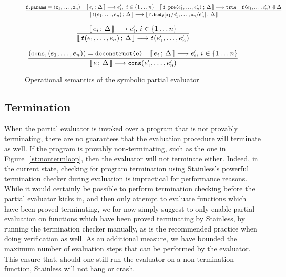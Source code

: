 \documentclass[a4paper,twoside]{article}
\newcommand{\lb}[2]{\llbracket\, #1\,;\, #2\, \rrbracket}
\newcommand{\RefFig}[1]{Figure~\ref{#1}}
\newcommand{\stt}[1]{\texttt{\small{#1}}}
\begin{document}
\begin{landscape}
\begin{figure}[htb]
\begin{framed}
\begin{equation}
\dfrac{
 \stt{f.params} = \langle \stt{x}_1, \ldots, \stt{x}_n \rangle
 \quad
 \lb{e_i}{\Delta} \longrightarrow e_i',\  i \in \{1 \ldots n\}
 \quad
 \lb{\stt{f.pre($e_1',\ldots,e_n'$)}}{\Delta} \longrightarrow \stt{true}
 \quad  \stt{f($e_1',\ldots,e_n'$)} \Downarrow \Delta
}{
  \lb{\stt{f}(e_1,\ldots,e_n)}{\Delta} \longrightarrow
  \lb{\stt{f.body}[\stt{x}_1/e_1',\ldots,\stt{x}_n/e_n']}{\Delta}
}
\label{fig:symbolicsem:fi2}
\end{equation}

\begin{equation}
\dfrac{
 \lb{e_i}{\Delta} \longrightarrow e_i',\, i \in \{1 \ldots n\}
}{
  \lb{\stt{f}(e_1,\ldots,e_n)}{\Delta} \longrightarrow
  \stt{f}(e_1',\ldots,e_n')
}
\label{fig:symbolicsem:fi3}
\end{equation}

\begin{equation}
\dfrac{
  (\stt{cons}, (e_1, \ldots, e_n)) = \stt{deconstruct(e)} \quad
  \lb{e_i}{\Delta} \longrightarrow e_i',\, i \in \{1 \ldots n\}
}{
  \lb{e}{\Delta} \longrightarrow \stt{cons}(e_1', \ldots, e_n')
}
\end{equation}

\end{framed}
\vspace{-10pt}
\caption{Operational semantics of the symbolic partial evaluator \label{fig:symbolicsem}}
\end{figure}
\end{landscape}

\subsection{Termination}
\label{term}

When the partial evaluator is invoked over a program that is not provably terminating, there are no guarantees that the evaluation procedure will terminate as well. If the program is provably non-terminating, such as the one in \RefFig{lst:nontermloop}, then the evaluator will not terminate either. Indeed, in the current state, checking for program termination using Stainless's powerful termination checker during evaluation is impractical for performance reasons. While it would certainly be possible to perform termination checking before the partial evaluator kicks in, and then only attempt to evaluate functions which have been proved terminating, we for now simply suggest to only enable partial evaluation on functions which have been proved terminating by Stainless, by running the termination checker manually, as is the recommended practice when doing verification as well. As an additional measure, we have bounded the maximum number of evaluation steps that can be performed by the evaluator. This ensure that, should one still run the evaluator on a non-termination function, Stainless will not hang or crash.\\
\end{document}
